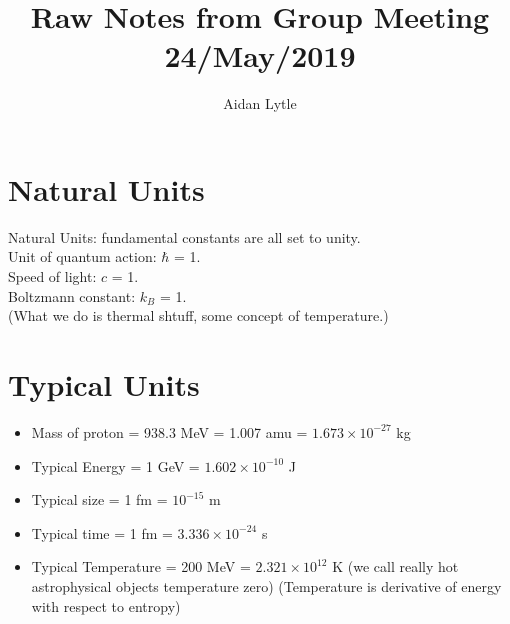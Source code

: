 \documentclass{article}
\begin{document}
\title{Raw Notes from Group Meeting 24/May/2019}
\author{Aidan Lytle}

\maketitle

\section{Natural Units}
\vspace{10 mm}

Natural Units: fundamental constants are all set to unity.\\
Unit of quantum action: $\hbar$ = 1. \\
Speed of light: $c$ = 1. \\
Boltzmann constant: $k_B$ = 1. \\
(What we do is thermal shtuff, some concept of temperature.)

\section{Typical Units}

\begin{itemize}
\setlength\itemsep{0em}
\item Mass of proton = 938.3 MeV = 1.007 amu = $1.673 \times 10^{-27}$ kg
\item Typical Energy = 1 GeV = $1.602 \times 10^{-10}$ J
\item Typical size = 1 fm = $10^{-15}$ m
\item Typical time = 1 fm = $3.336 \times 10^{-24}$ s
\item Typical Temperature = 200 MeV = $2.321 \times 10^{12}$ K
\newline (we call really hot astrophysical objects temperature zero)
\newline (Temperature is derivative of energy with respect to entropy)
\end{itemize}
\end{document}
